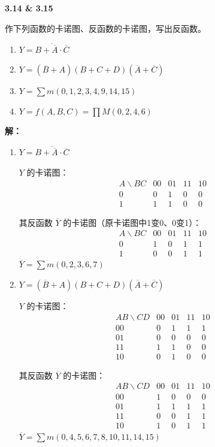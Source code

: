 \documentclass[10pt, a4paper]{article}
\newcommand{\question}[2]{
    \vspace{2ex}\noindent\textbf{#1}\ {\kaishu #2} \par\vspace{1ex}
}
\newcommand{\solution}[1]{
    \noindent\textbf{解：}{\songti #1} \par\vspace{3ex}
}
\begin{document}
\question{3.14 \& 3.15}{
作下列函数的卡诺图、反函数的卡诺图，写出反函数。
\begin{enumerate}
    \item[(1)] $Y = \overline{B + \overline{A} \cdot \overline{C}}$
    \item[(3)] $Y = (\overline{B} + A)(B + C + D)(\overline{A} + \overline{C})$
    \item[(5)] $Y = \sum m(0, 1, 2, 3, 4, 9, 14, 15)$
    \item[(7)] $Y = f(A, B, C) = \prod M(0, 2, 4, 6)$
\end{enumerate}
}

\solution{
\begin{enumerate}
\item[(1)] $Y = \overline{B + \overline{A} \cdot \overline{C}}$

$Y$ 的卡诺图：
\[
\begin{array}{c|cccc}
A\backslash BC  & 00 & 01 & 11 & 10 \\ \hline
0 & 0 & 1 & 0 & 0 \\
1 & 1 & 1 & 0 & 0 
\end{array}
\]

其反函数 $\overline{Y}$ 的卡诺图（原卡诺图中1变0、0变1）：
\[
\begin{array}{c|cccc}
A\backslash BC  & 00 & 01 & 11 & 10 \\ \hline
0 & 1 & 0 & 1 & 1 \\
1 & 0 & 0 & 1 & 1 
\end{array}
\]
$\overline{Y} = \sum m(0,2,3,6,7)$

\item[(3)] $Y = (\overline{B} + A)(B + C + D)(\overline{A} + \overline{C})$

$Y$ 的卡诺图：
\[
\begin{array}{c|cccc}
AB\backslash CD & 00 & 01 & 11 & 10 \\ \hline
00 & 0 & 1 & 1 & 1 \\
01 & 0 & 0 & 0 & 0 \\
11 & 1 & 1 & 0 & 0 \\
10 & 0 & 1 & 0 & 0 
\end{array}
\]

其反函数 $\overline{Y}$ 的卡诺图：
\[
\begin{array}{c|cccc}
AB\backslash CD & 00 & 01 & 11 & 10 \\ \hline
00 & 1 & 0 & 0 & 0 \\
01 & 1 & 1 & 1 & 1 \\
11 & 0 & 0 & 1 & 1 \\
10 & 1 & 0 & 1 & 1 
\end{array}
\]
$\overline{Y} = \sum m(0,4,5,6,7,8,10,11,14,15)$


\end{enumerate}}
\end{document}

